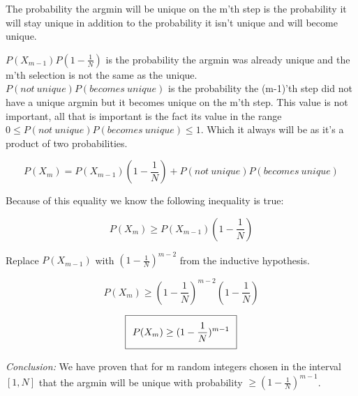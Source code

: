 \documentclass[11pt]{article}
\begin{document}
The probability the argmin will be unique on the m'th step is the probability it will stay unique in addition to the probability it isn't unique and will become unique. 

$P(X_{m-1})P(1 - \frac{1}{N})$ is the probability the argmin was already unique and the m'th selection is not the same as the unique. $P(not \ unique)P(becomes \ unique)$ is the probability the (m-1)'th step did not have a unique argmin but it becomes unique on the m'th step. This value is not important, all that is important is the fact its value in the range $0 \leq P(not \ unique)P(becomes \ unique) \leq 1$. Which it always will be as it's a product of two probabilities.

$$P(X_{m}) = P(X_{m-1})(1 - \frac{1}{N}) + P(not \ unique)P(becomes \ unique)$$

Because of this equality we know the following inequality is true:

$$P(X_{m}) \geq P(X_{m-1})(1 - \frac{1}{N})$$

Replace $P(X_{m-1})$ with $(1 - \frac{1}{N})^{m-2}$ from the inductive hypothesis.

$$P(X_{m}) \geq (1 - \frac{1}{N})^{m-2}(1 - \frac{1}{N})$$

\begin{equation}
\setlength\fboxsep{0.25cm}
\setlength\fboxrule{0.4pt}
\boxed{P(X_{m}) \geq (1 - \frac{1}{N})^{m-1}}
\end{equation}

\textit{Conclusion:} We have proven that for m random integers chosen in the interval $[1, N]$ that the argmin will be unique with probability $\geq (1 - \frac{1}{N})^{m-1}$.
\end{document}

